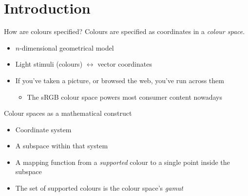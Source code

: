 \documentclass[aspectratio=169,handout,usepdftitle=false]{fireshonks}
\begin{document}
\section{Introduction}
\begin{frame}{How are colours specified?}
    Colours are specified as coordinates in a \emph{colour space}.
    \begin{itemize}[<+(1)->]
        \item $n$-dimensional geometrical model
        \item Light stimuli (colours) $\leftrightarrow$ vector coordinates
        \item If you've taken a picture, or browsed the web, you've run across them
              \begin{itemize}
                  \item The sRGB colour space powers most consumer content nowadays
              \end{itemize}
    \end{itemize}
\end{frame}
\begin{frame}{Colour spaces as a mathematical construct}
    \begin{itemize}
        \item Coordinate system
        \item A subspace within that system
        \item A mapping function from a \emph{supported} colour to a single point inside the subspace
        \item The set of supported colours is the colour space's \emph{gamut}
    \end{itemize}
\end{frame}
\end{document}
